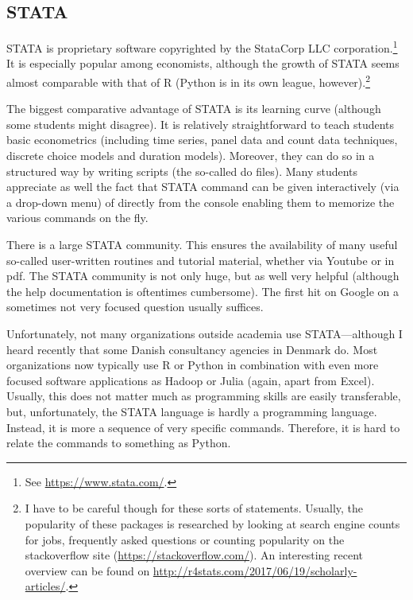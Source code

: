 \documentclass[fleqn,10pt]{SelfArx} %
\begin{document}
\subsection*{STATA}

STATA is proprietary software copyrighted by the StataCorp LLC corporation.\footnote{See \href{https://www.stata.com}{https://www.stata.com/}.} It is especially popular among economists, although the growth of STATA seems almost comparable with that of R (Python is in its own league, however).\footnote{I have to be careful though for these sorts of statements. Usually, the popularity of these packages is researched by looking at search engine counts for jobs, frequently asked questions or counting popularity on the stackoverflow site (\href{https://stackoverflow.com/}{https://stackoverflow.com/}). An interesting recent overview can be found on \href{http://r4stats.com/2017/06/19/scholarly-articles/}{http://r4stats.com/2017/06/19/scholarly-articles/}.}

The biggest comparative advantage of STATA is its learning curve (although some students might disagree). It is relatively straightforward to teach students basic econometrics (including time series, panel data and count data techniques, discrete choice models and duration models). Moreover, they can do so in a structured way by writing scripts (the so-called do files). Many students appreciate as well the fact that STATA command can be given interactively (via a drop-down menu) of directly from the console enabling them to memorize the various commands on the fly. 

There is a large STATA community. This ensures the availability of many useful so-called user-written routines and tutorial material, whether via Youtube or in pdf. The STATA community is not only huge, but as well very helpful (although the help documentation is oftentimes cumbersome). The first hit on Google on a sometimes not very focused question usually suffices.

Unfortunately, not many organizations outside academia use STATA---although I heard recently that some Danish consultancy agencies in Denmark do. Most organizations now typically use R or Python in combination with even more focused software applications as Hadoop or Julia (again, apart from Excel). Usually, this does not matter much as programming skills are easily transferable, but, unfortunately, the STATA language is hardly a programming language. Instead, it is more a sequence of very specific commands. Therefore, it is hard to relate the commands to something as Python.
\end{document}
